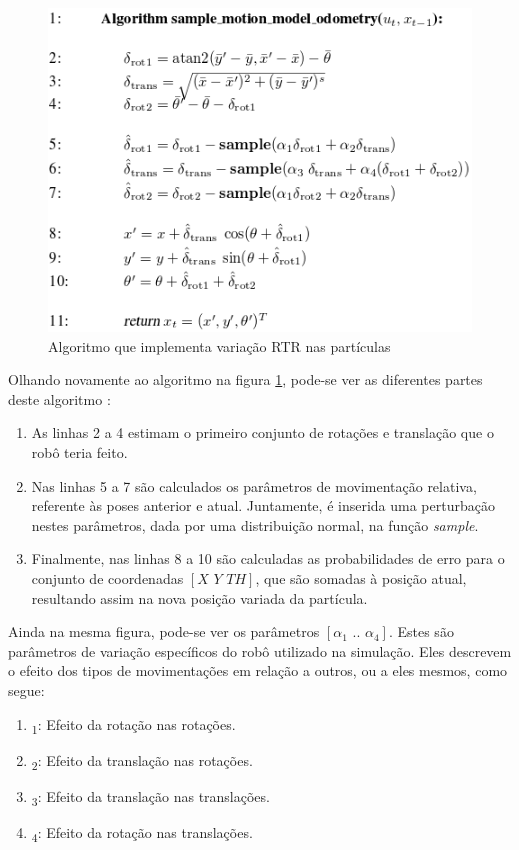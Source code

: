 \documentclass[
	12pt,				%
	openright,			%
	oneside,			%
	a4paper,			%
	english,			%
	french,				%
	spanish,			%
	brazil,				%
	]{abntex2}
\begin{document}
\begin{figure}[h!]
    \centering
    \includegraphics[scale=0.6]{figs/sample_odom}
    \caption{Algoritmo que implementa variação RTR nas partículas}
    \label{fig:sample_odometry}
\end{figure}

Olhando novamente ao algoritmo na figura \ref{fig:sample_odometry}, pode-se ver as diferentes partes deste algoritmo \cite{THR05}:

\begin{enumerate}
    \item As linhas 2 a 4 estimam o primeiro conjunto de rotações e translação que o robô teria feito.
    \item Nas linhas 5 a 7 são calculados os parâmetros de movimentação relativa, referente às poses anterior e atual. Juntamente, é inserida uma perturbação nestes parâmetros, dada por uma distribuição normal, na função \emph{sample}.
    \item Finalmente, nas linhas 8 a 10 são calculadas as probabilidades de erro para o conjunto de coordenadas $[X\,\,Y\,\,TH]$, que são somadas à posição atual, resultando assim na nova posição variada da partícula.
\end{enumerate}

Ainda na mesma figura, pode-se ver os parâmetros $[\alpha_1\,\,..\,\,\alpha_4]$. Estes são parâmetros de variação específicos do robô utilizado na simulação. Eles descrevem o efeito dos tipos de movimentações em relação a outros, ou a eles mesmos, como segue:

\begin{enumerate}
    \item \textalpha\textsubscript{1}: Efeito da rotação nas rotações.
    \item \textalpha\textsubscript{2}: Efeito da translação nas rotações.
    \item \textalpha\textsubscript{3}: Efeito da translação nas translações.
    \item \textalpha\textsubscript{4}: Efeito da rotação nas translações.
\end{enumerate}
\end{document}
